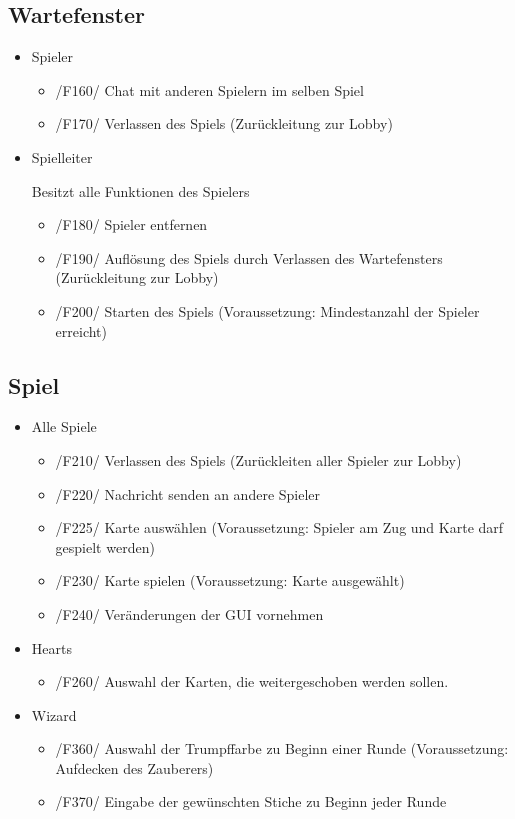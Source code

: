 \documentclass{article}
\begin{document}
\subsection{\gls{Wartefenster}}
\begin{itemize}
	\item Spieler
	\begin{itemize}
		\item /F160/ Chat mit anderen Spielern im selben Spiel
		\item /F170/ Verlassen des Spiels (Zurückleitung zur \gls{Lobby})
	\end{itemize}
	\item Spielleiter
	
	Besitzt alle Funktionen des Spielers
	\begin{itemize}
		\item /F180/ Spieler entfernen
		\item /F190/ Auflösung des Spiels durch Verlassen des Wartefensters (Zurückleitung zur \gls{Lobby})
		\item /F200/ Starten des Spiels (Voraussetzung: Mindestanzahl der Spieler erreicht)
	\end{itemize}
\end{itemize}

\subsection{Spiel}
\begin{itemize}
	\item Alle Spiele
	\begin{itemize}
		\item /F210/ Verlassen des Spiels (Zurückleiten aller Spieler zur Lobby)
		\item /F220/ Nachricht senden an andere Spieler
		\item /F225/ Karte auswählen (Voraussetzung: Spieler am Zug und Karte darf gespielt werden)
		\item /F230/ Karte spielen (Voraussetzung: Karte ausgewählt)
		\item /F240/ Veränderungen der GUI vornehmen
	\end{itemize}
	\item Hearts
	\begin{itemize}
		\item /F260/ Auswahl der Karten, die weitergeschoben werden sollen.
	\end{itemize}
	\item Wizard
	\begin{itemize}
		\item /F360/ Auswahl der Trumpffarbe zu Beginn einer Runde (Voraussetzung: Aufdecken des Zauberers)
		\item /F370/ Eingabe der gewünschten Stiche zu Beginn jeder Runde
	\end{itemize}
\end{itemize}
\end{document}
